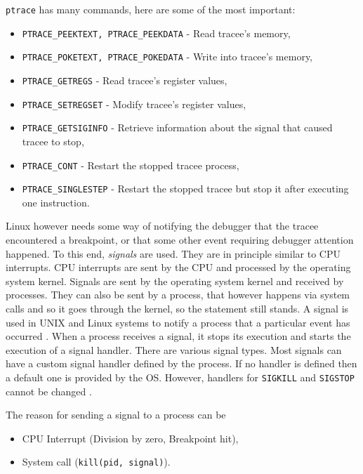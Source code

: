 \texttt{ptrace} has many commands, here are some of the most important:
\begin{itemize}
    \item \texttt{PTRACE\_PEEKTEXT, PTRACE\_PEEKDATA} - Read tracee's memory,
    \item \texttt{PTRACE\_POKETEXT, PTRACE\_POKEDATA} - Write into tracee's
          memory,
    \item \texttt{PTRACE\_GETREGS} - Read tracee's register values,
    \item \texttt{PTRACE\_SETREGSET} - Modify tracee's register values,
    \item \texttt{PTRACE\_GETSIGINFO} - Retrieve information about the signal
                                        that caused tracee to stop,
    \item \texttt{PTRACE\_CONT} - Restart the stopped tracee process,
    \item \texttt{PTRACE\_SINGLESTEP} - Restart the stopped tracee but
          stop it after executing one instruction.
\end{itemize}

Linux however needs some way of notifying the debugger that the tracee
encountered a breakpoint, or that some other event requiring debugger attention
happened. To this end, \textit{signals} are used. They are in principle similar
to CPU interrupts. CPU interrupts are sent by the CPU and processed by the
operating system kernel. Signals are sent by the operating system kernel and
received by processes. They can also be sent by a process, that however happens
via system calls and so it goes through the kernel, so the statement still
stands. A signal is used in UNIX and Linux systems to notify a process that a
particular event has occurred \cite{os-concepts}.  When a process receives a
signal, it stops its execution and starts the execution of a signal handler.
There are various signal types. Most signals can have a custom signal handler
defined by the process. If no handler is defined then a default one is provided
by the OS. However, handlers for \texttt{SIGKILL} and \texttt{SIGSTOP} cannot
be changed \cite{signals}.

The reason for sending a signal to a process can be 
\begin{itemize}
    \item CPU Interrupt (Division by zero, Breakpoint hit),
    \item System call (\texttt{kill(pid, signal)}).
\end{itemize}

